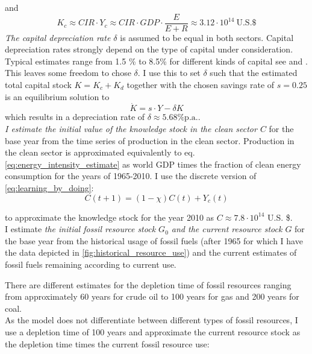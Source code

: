 and 
\begin{equation}
  K_c \approx CIR \cdot Y_c \approx CIR \cdot GDP \cdot \frac{E}{E + R} \approx 3.12 \cdot 10^{14} ~ \textrm{U.S.} \$
  \label{eq:approx_clean_capital}
\end{equation}
\textit{The capital depreciation rate $\delta$} is assumed to be equal in both sectors. Capital depreciation rates strongly depend on the type of capital under consideration. Typical estimates range from 1.5 \% to 8.5\% for different kinds of capital see \cite{Kamps2005} and \cite{Gupta2014}. This leaves some freedom to chose $\delta$. I use this to set $\delta$ such that the estimated total capital stock $K = K_c + K_d$ together with the chosen savings rate of $s=0.25$ is an equilibrium solution to 
\begin{equation}
  \dot{K} = s \cdot Y - \delta K
  \label{eq:delta_estimate}
\end{equation} 
which results in a depreciation rate of $\delta\approx 5.68 \% \mathrm{p.a.}$.\\

\textit{I estimate the initial value of the knowledge stock in the clean sector $C$} for the base year from the time series of production in the clean sector. Production in the clean sector is approximated equivalently to eq. \ref{eq:energy_intensity_estimate} as world GDP times the fraction of clean energy consumption for the years of 1965-2010. I use the discrete version of \eqref{eq:learning_by_doing}:
\begin{equation} 
  C(t+1) = (1-\chi)C(t) + Y_c(t)
  \label{eq:discrete_clean_knowledge}
\end{equation}

to approximate the knowledge stock for the year 2010 as $C \approx 7.8 \cdot 10^{14}$ U.S. \$. \\
I estimate \textit{the initial fossil resource stock $G_0$ and the current resource stock $G$} for the base year from the historical usage of fossil fuels (after 1965 for which I have the data depicted in \cref{fig:historical_resource_use}) and the current estimates of fossil fuels remaining according to current use. 

There are different estimates for the depletion time of fossil resources ranging from approximately 60 years for crude oil to 100 years for gas and 200 years for coal.\\ As the model does not differentiate between different types of fossil resources, I use a depletion time of 100 years and approximate the current resource stock as the depletion time times the current fossil resource use:

